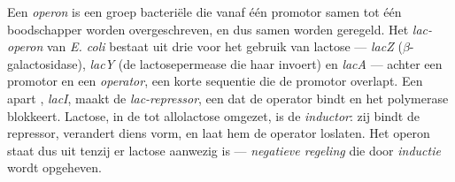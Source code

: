 \begin{definition}\label{def:b1:expression-control:operon}
Een \emph{operon} is een groep bacteriële  die vanaf één promotor samen tot
één boodschapper worden overgeschreven, en dus samen worden geregeld. Het
\emph{lac-operon} van \emph{E. coli} bestaat uit drie  voor het gebruik van
lactose --- \emph{lacZ} ($\beta$-galactosidase), \emph{lacY} (de lactosepermease
die haar invoert) en \emph{lacA} --- achter een promotor en een \emph{operator},
een korte sequentie die de promotor overlapt. Een apart , \emph{lacI}, maakt de
\emph{lac-repressor}, een  dat de operator bindt en het polymerase blokkeert.
Lactose, in de  tot allolactose omgezet, is de \emph{inductor}: zij bindt de
repressor, verandert diens vorm, en laat hem de operator loslaten. Het operon staat
dus uit tenzij er lactose aanwezig is --- \emph{negatieve regeling} die door
\emph{inductie} wordt opgeheven.
\end{definition}

